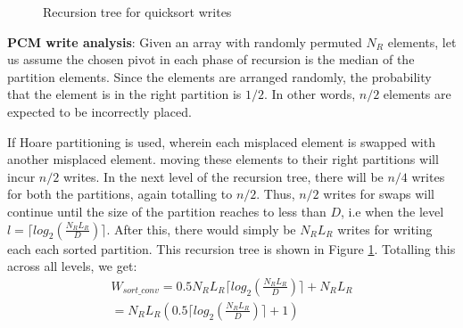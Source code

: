 \begin{figure}
\centering
{} 
\caption{Recursion tree for quicksort writes}
\label{fig:rec_tree}
\end{figure}

\textbf{PCM write analysis}: 
Given an array with randomly permuted $N_R$ elements, let us assume the chosen pivot in each phase of recursion is the median of the partition elements. Since the elements are arranged randomly, the probability that the element is in the right partition is $1/2$. In other words, $n/2$ elements are expected to be incorrectly placed.

If Hoare partitioning \cite{cormen} is used, wherein each misplaced element is swapped with another misplaced element. moving these elements to their right partitions will incur $n/2$ writes. In the next level of the recursion tree, there will be $n/4$ writes for both the partitions, again totalling to $n/2$. Thus, $n/2$ writes for swaps will continue until the size of the partition reaches to less than $D$, i.e when the level $l = \lceil log_2 (\frac{N_R L_R}{D}) \rceil$. After this, there would simply be $N_R L_R$ writes for writing each each sorted partition. This recursion tree is shown in Figure \ref{fig:rec_tree}. Totalling this across all levels, we get:
\begin{equation}
\label{eq:sort_conv}
\begin{split}
W_{sort\_conv} = 0.5N_RL_R \lceil log_2(\frac{N_R L_R}{D}) \rceil + N_R L_R\\
  = N_RL_R (0.5 \lceil log_2(\frac{N_R L_R}{D}) \rceil + 1) \\
\end{split}
\end{equation}



